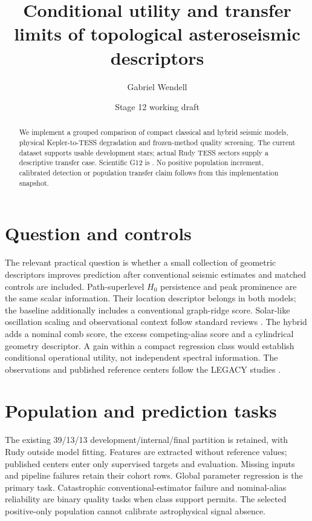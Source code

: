 \documentclass[11pt]{article}
\title{Conditional utility and transfer limits of topological asteroseismic descriptors}
\author{Gabriel Wendell}
\date{Stage 12 working draft}
\begin{document}
\maketitle
\begin{abstract}
We implement a grouped comparison of compact classical and hybrid seismic models,
physical Kepler-to-TESS degradation and frozen-method quality screening. The current
dataset supports \DevelopmentStars{} usable development stars; \TessSectors{} actual
Rudy TESS sectors supply a descriptive transfer case. Scientific G12 is
\GateStatus. No positive population increment, calibrated detection or population
transfer claim follows from this implementation snapshot.
\end{abstract}
\section{Question and controls}
The relevant practical question is whether a small collection of geometric
descriptors improves prediction after conventional seismic estimates and matched
controls are included. Path-superlevel $H_0$ persistence and peak prominence are
the same scalar information. Their location descriptor belongs in both models;
the baseline additionally includes a conventional graph-ridge score. Solar-like
oscillation scaling and observational context follow standard reviews
\cite{ChaplinMiglio2013,GarciaBallot2019}. The hybrid
adds a nominal comb score, the excess competing-alias score and a cylindrical
geometry descriptor. A gain within a compact regression class would establish
conditional operational utility, not independent spectral information.
The observations and published reference centers follow the LEGACY studies
\cite{Lund2017,SilvaAguirre2017,Lund2017Erratum}.
\section{Population and prediction tasks}
The existing 39/13/13 development/internal/final partition is retained, with Rudy
outside model fitting. Features are extracted without reference values;
published centers enter only supervised targets and evaluation. Missing inputs
and pipeline failures retain their cohort rows. Global parameter regression is
the primary task. Catastrophic conventional-estimator failure and nominal-alias
reliability are binary quality tasks when class support permits. The selected
positive-only population cannot calibrate astrophysical signal absence.
\end{document}
